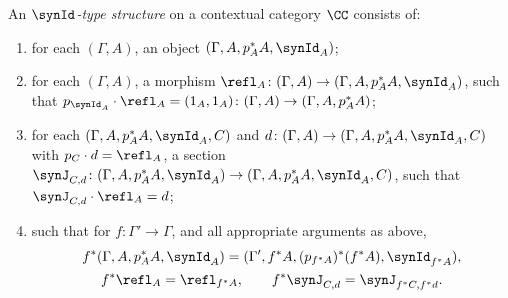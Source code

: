\begin{definition}
An \emph{$\synId$-type structure} on a contextual category $\CC$ consists of:
\begin{enumerate}
  \item for each $(\Gamma, A)$, an object $(\Gamma, A, p_A^*A, \synId_A)$;
  \item for each $(\Gamma,A)$, a morphism $\refl_A \colon (\Gamma,A) \to (\Gamma, A, p_A^*A, \synId_A)$, such that $p_{\synId_A} \cdot \refl_A = (1_A,1_A) \colon (\Gamma,A) \to (\Gamma, A, p_A^*A)$;
  \item for each $(\Gamma, A, p_A^*A, \synId_A, C)$ and $d \colon (\Gamma,A) \to (\Gamma, A, p_A^*A, \synId_A, C)$ with $p_C \cdot d = \refl_A$, a section $\synJ_{C,d} \colon (\Gamma, A, p_A^*A, \synId_A) \to (\Gamma, A, p_A^*A, \synId_A, C)$, such that $\synJ_{C,d} \cdot \refl_A = d$;
\item such that for $f \colon \Gamma' \to \Gamma$, and all appropriate arguments as above,
   \begin{gather*}
     f^*(\Gamma, A, p_A^*A, \synId_A) = (\Gamma', f^*A, (p_{f^*A})^*(f^*A), \synId_{f^*A}), \\
     f^*\refl_A = \refl_{f^*A}, \qquad f^*\synJ_{C,d} = \synJ_{f^*C,f^*d}.
   \end{gather*}
 \end{enumerate}
\end{definition}

